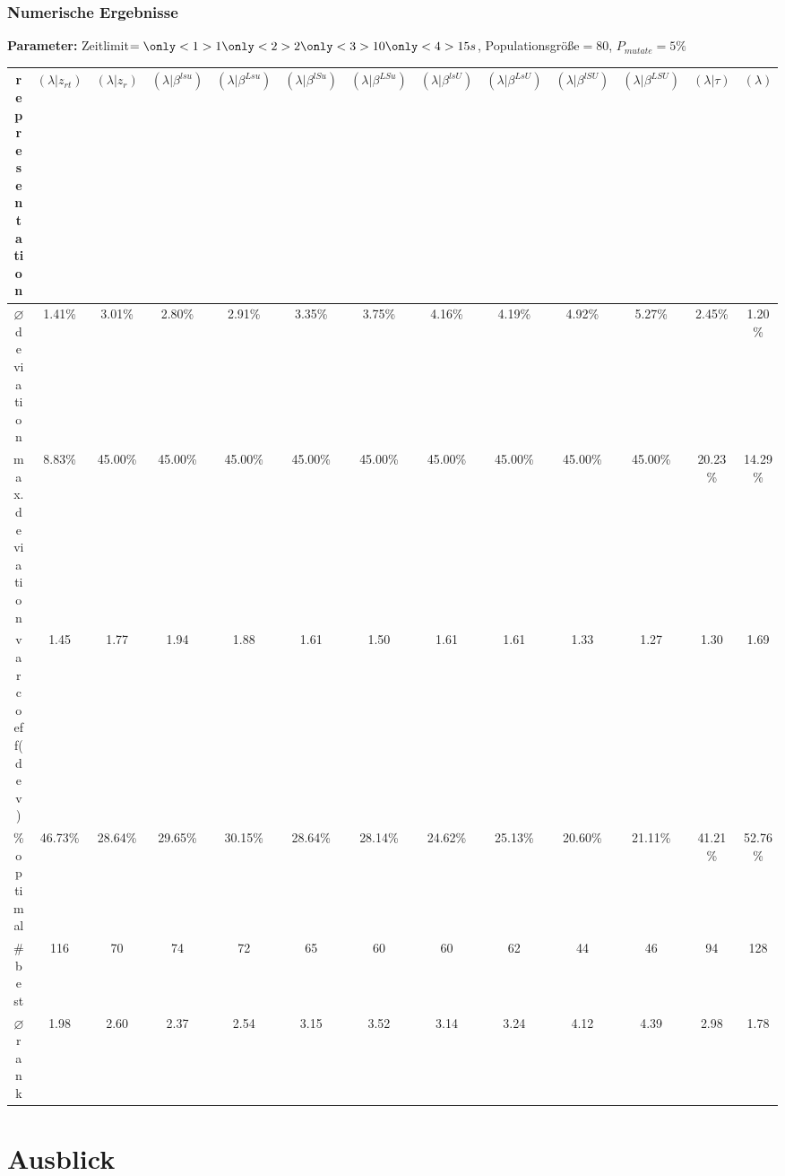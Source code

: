 \begin{frame}[t]
\frametitle{Numerische Ergebnisse}
\begin{footnotesize}
\textbf{Parameter:} Zeitlimit$=\only<1>{1}\only<2>{2}\only<3>{10}\only<4>{15}s$, Populationsgröße$=80$, $P_{mutate}=5\%$\\

\begin{center}

\begin{tabular}{ccccccccccccc}
\hline
representation & $(\lambda|z_{rt})$ & $(\lambda|z_r)$ & $(\lambda|\beta^{lsu})$ & $(\lambda|\beta^{Lsu})$ & $(\lambda|\beta^{lSu})$ & $(\lambda|\beta^{LSu})$ & $(\lambda|\beta^{lsU})$ & $(\lambda|\beta^{LsU})$ & $(\lambda|\beta^{lSU})$ & $(\lambda|\beta^{LSU})$ & $(\lambda|\tau)$ & $(\lambda)$\\[3pt]
\hline
$\varnothing$ deviation&1.41\%&3.01\%&2.80\%&2.91\%&3.35\%&3.75\%&4.16\%&4.19\%&4.92\%&5.27\%&2.45\%&1.20\%\\
\hline
max. deviation&8.83\%&45.00\%&45.00\%&45.00\%&45.00\%&45.00\%&45.00\%&45.00\%&45.00\%&45.00\%&20.23\%&14.29\%\\
\hline
varcoeff(dev)&1.45&1.77&1.94&1.88&1.61&1.50&1.61&1.61&1.33&1.27&1.30&1.69\\
\hline
\% optimal&46.73\%&28.64\%&29.65\%&30.15\%&28.64\%&28.14\%&24.62\%&25.13\%&20.60\%&21.11\%&41.21\%&52.76\%\\
\hline
\# best&116&70&74&72&65&60&60&62&44&46&94&128\\
\hline
$\varnothing$ rank&1.98&2.60&2.37&2.54&3.15&3.52&3.14&3.24&4.12&4.39&2.98&1.78\\\hline
\end{tabular}

\end{center}
\end{footnotesize}
\end{frame}


\section{Ausblick}

